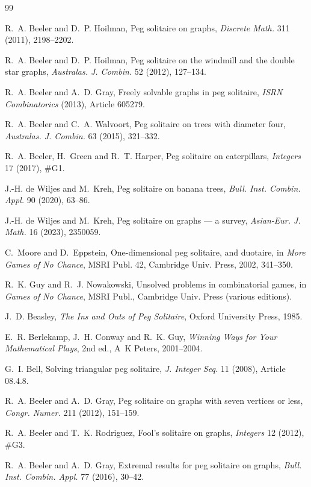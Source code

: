\documentclass[11pt]{article}
\theoremstyle{definition}
\begin{document}
\begin{thebibliography}{99}

 R.~A. Beeler and D.~P. Hoilman, Peg solitaire on
graphs, \emph{Discrete Math.} 311 (2011), 2198--2202.

 R.~A. Beeler and D.~P. Hoilman, Peg solitaire on the
windmill and the double star graphs, \emph{Australas. J. Combin.} 52
(2012), 127--134.

 R.~A. Beeler and A.~D. Gray, Freely solvable graphs in
peg solitaire, \emph{ISRN Combinatorics} (2013), Article 605279.

 R.~A. Beeler and C.~A. Walvoort, Peg solitaire on
trees with diameter four, \emph{Australas. J. Combin.} 63 (2015),
321--332.

 R.~A. Beeler, H.~Green and R.~T. Harper, Peg
solitaire on caterpillars, \emph{Integers} 17 (2017), \#G1.

 J.-H. de Wiljes and M.~Kreh, Peg solitaire on banana
trees, \emph{Bull. Inst. Combin. Appl.} 90 (2020), 63--86.

 J.-H. de Wiljes and M.~Kreh, Peg solitaire on graphs
--- a survey, \emph{Asian-Eur. J. Math.} 16 (2023), 2350059.

 C.~Moore and D.~Eppstein, One-dimensional peg solitaire,
and duotaire, in \emph{More Games of No Chance}, MSRI Publ. 42,
Cambridge Univ. Press, 2002, 341--350.

 R.~K. Guy and R.~J. Nowakowski, Unsolved
problems in combinatorial games, in \emph{Games of No Chance}, MSRI
Publ., Cambridge Univ. Press (various editions).

 J.~D. Beasley, \emph{The Ins and Outs of Peg
Solitaire}, Oxford University Press, 1985.

 E.~R. Berlekamp, J.~H. Conway and R.~K. Guy,
\emph{Winning Ways for Your Mathematical Plays}, 2nd ed., A~K Peters,
2001--2004.

 G.~I. Bell, Solving triangular peg solitaire,
\emph{J. Integer Seq.} 11 (2008), Article 08.4.8.

 R.~A. Beeler and A.~D. Gray, Peg solitaire on graphs
with seven vertices or less, \emph{Congr. Numer.} 211 (2012),
151--159.

 R.~A. Beeler and T.~K. Rodriguez, Fool's solitaire on
graphs, \emph{Integers} 12 (2012), \#G3.

 R.~A. Beeler and A.~D. Gray, Extremal results for peg
solitaire on graphs, \emph{Bull. Inst. Combin. Appl.} 77 (2016),
30--42.


\end{thebibliography}
\end{document}
